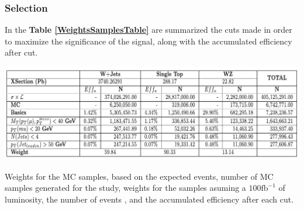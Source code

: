 \documentclass{beamer}
\begin{document}
\begin{frame}
\frametitle{Selection}
\begin{justify}
	In the \textbf{Table \ref{WeightsSamplesTable}} are summarized the cuts made in order to maximize the significance of the signal, along with the accumulated efficiency after cut.  
	
\end{justify}

\begin{table}[]
	\includegraphics[width=1.0\textwidth]{pictures/Selection/TablaCortes}
	
	\caption{{\scriptsize Weights for the MC samples, based on the expected events, number of MC samples generated for the study, weights for the samples asuming a $100\text{fb}^{-1}$ of luminosity, the number of events , and the accumulated efficiency after each cut.}}
	\label{WeightsSamplesTable}
\end{table}

\end{frame}

\end{document}
